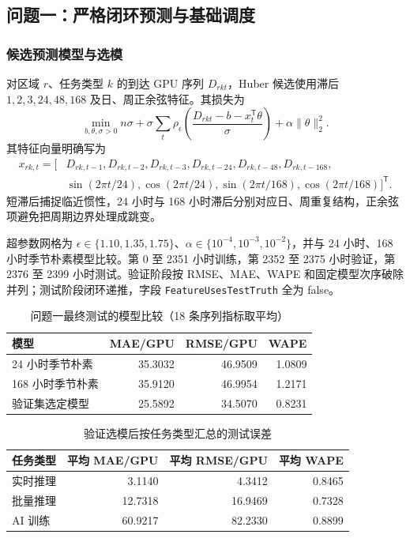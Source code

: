 \subsection{问题一：严格闭环预测与基础调度}
\subsubsection{候选预测模型与选模}
对区域 $r$、任务类型 $k$ 的到达 GPU 序列 $D_{rkt}$，Huber 候选使用滞后 $1,2,3,24,48,168$ 及日、周正余弦特征。其损失为
\begin{equation}
\min_{b,\theta,\sigma>0}n\sigma+\sigma\sum_t\rho_{\epsilon}\!\left(\frac{D_{rkt}-b-x_t^\mathsf T\theta}{\sigma}\right)+\alpha\|\theta\|_2^2.
\end{equation}
其特征向量明确写为
\begin{equation}
\begin{aligned}
x_{rk,t}=\big[&D_{rk,t-1},D_{rk,t-2},D_{rk,t-3},D_{rk,t-24},D_{rk,t-48},D_{rk,t-168},\\
&\sin(2\pi t/24),\cos(2\pi t/24),\sin(2\pi t/168),\cos(2\pi t/168)\big]^{\mathsf T}.
\end{aligned}
\end{equation}
短滞后捕捉临近惯性，24 小时与 168 小时滞后分别对应日、周重复结构，正余弦项避免把周期边界处理成跳变。

超参数网格为 $\epsilon\in\{1.10,1.35,1.75\}$、$\alpha\in\{10^{-4},10^{-3},10^{-2}\}$，并与 24 小时、168 小时季节朴素模型比较。第 0 至 2351 小时训练，第 2352 至 2375 小时验证，第 2376 至 2399 小时测试。验证阶段按 RMSE、MAE、WAPE 和固定模型次序破除并列；测试阶段闭环递推，字段 \texttt{FeatureUsesTestTruth} 全为 false。

\begin{table}[H]\centering
\caption{问题一最终测试的模型比较（18 条序列指标取平均）}\label{tab:q1model}
\begin{tabular}{lrrr}\toprule
模型 & MAE/GPU & RMSE/GPU & WAPE\\\midrule
24 小时季节朴素 & 35.3032 & 46.9509 & 1.0809\\
168 小时季节朴素 & 35.9120 & 46.9954 & 1.2171\\
验证集选定模型 & 25.5892 & 34.5070 & 0.8231\\\bottomrule
\end{tabular}
\end{table}

\begin{table}[H]\centering
\caption{验证选模后按任务类型汇总的测试误差}\label{tab:q1type}
\begin{tabular}{lrrr}\toprule
任务类型 & 平均 MAE/GPU & 平均 RMSE/GPU & 平均 WAPE\\\midrule
实时推理 & 3.1140 & 4.3412 & 0.8465\\
批量推理 & 12.7318 & 16.9469 & 0.7328\\
AI 训练 & 60.9217 & 82.2330 & 0.8899\\\bottomrule
\end{tabular}
\end{table}

